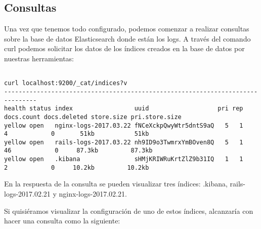 \subsection{Consultas}
\label{consultas}

Una vez que tenemos todo configurado, podemos comenzar a realizar consultas
sobre la base de datos Elasticsearch donde están los logs. A través del comando
curl podemos solicitar los datos de los índices creados en la base de datos por
nuestras herramientas:

\begin{lstlisting}

curl localhost:9200/_cat/indices?v
-------------------------------------------------------------------------------
health status index                 uuid                   pri rep docs.count docs.deleted store.size pri.store.size
yellow open   nginx-logs-2017.03.22 fNCeXckpQwyWtr5dntS9aQ   5   1          4            0       51kb           51kb
yellow open   rails-logs-2017.03.22 nh9ID9o3TwmrxYmBOven8Q   5   1         46            0     87.3kb         87.3kb
yellow open   .kibana               sHMjKRIWRuKrtZlZ9b31IQ   1   1          2            0     10.2kb         10.2kb

\end{lstlisting}

En la respuesta de la consulta se pueden visualizar tres índices: .kibana,
rails-logs-2017.02.21 y nginx-logs-2017.02.21.

Si quisiéramos visualizar la configuración de uno de estos índices, alcanzaría
con hacer una consulta como la siguiente:

